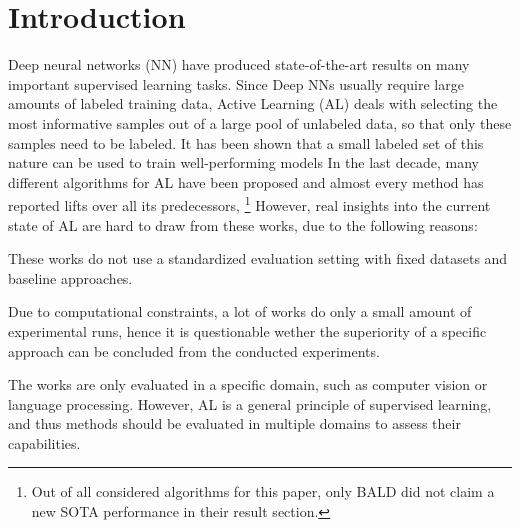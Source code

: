 \documentclass[]{article}
\begin{document}
\section{Introduction}\label{sec:introduction}
Deep neural networks (NN) have produced state-of-the-art results on many
important supervised learning tasks. Since Deep NNs usually require large
amounts of labeled training data, Active Learning (AL) deals with
selecting the most informative samples out of a large pool of unlabeled data, so
that only these samples need to be labeled. It has been shown that a small
labeled set of this nature can be used to train well-performing models
In the last decade, many different algorithms for AL have been proposed and
almost every method has reported lifts over all its predecessors, \footnote{Out
of all considered algorithms for this paper, only BALD \cite{gal2017deep} did
not claim a new SOTA performance in their result section.} However, real
insights into the current state of AL are hard to draw from these works, due to
the following reasons:
\begin{inparaenum}
\item\label{prob1al} These works do not use a standardized evaluation setting with fixed
datasets and baseline approaches.
\item Due to computational constraints, a lot of works do only a small amount of experimental
runs, hence it is questionable wether the superiority of a specific approach can
be concluded from the conducted experiments.
\item The works are only evaluated in a specific domain, such as computer vision
or language processing. However, AL is a general principle of supervised
learning, and thus methods should be evaluated in multiple domains to assess
their capabilities.
\end{inparaenum}
\end{document}
